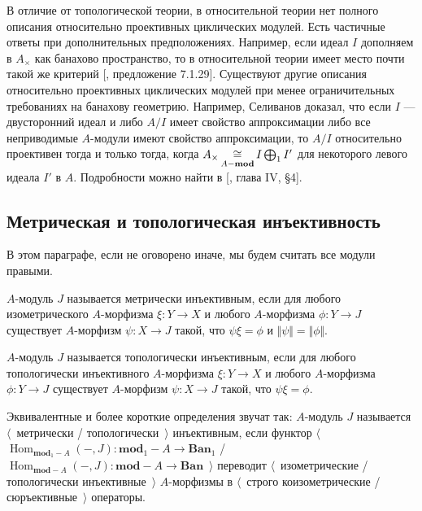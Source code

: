 В отличие от топологической теории, в относительной теории нет полного описания относительно проективных циклических модулей. Есть частичные ответы при дополнительных предположениях. Например, если идеал $I$ дополняем в $A_\times$ как банахово пространство, то в относительной теории имеет место почти такой же критерий [\cite{HelBanLocConvAlg}, предложение 7.1.29]. Существуют другие описания относительно проективных циклических модулей при менее ограничительных требованиях на банахову геометрию. Например, Селиванов доказал, что если $I$ --- двусторонний идеал и либо $A/I$ имеет свойство аппроксимации либо все неприводимые $A$-модули имеют свойство аппроксимации, то $A/I$  относительно проективен тогда и только тогда, когда $A_\times\mathop{\mathbin{\cong}}\limits_{A-\mathbf{mod}}I\bigoplus_1 I'$ для некоторого левого идеала $I'$ в $A$. Подробности можно найти в [\cite{HelHomolBanTopAlg}, глава IV, \S 4].




\subsection{Метрическая и топологическая инъективность}
\label{SubSectionMetricAndTopologicalInjectivity}

В этом параграфе, если не оговорено иначе, мы будем считать все модули правыми.

\begin{definition}\label{MetInjMod} $A$-модуль $J$ называется метрически инъективным, если для любого изометрического $A$-морфизма $\xi:Y\to X$ и любого $A$-морфизма $\phi:Y\to J$ существует $A$-морфизм $\psi:X\to J$ такой, что $\psi\xi=\phi$  и $\Vert\psi\Vert=\Vert\phi\Vert$.
\end{definition}

\begin{definition}\label{TopInjMod} $A$-модуль $J$ называется топологически инъективным, если для любого топологически инъективного $A$-морфизма $\xi:Y\to X$ и любого $A$-морфизма $\phi:Y\to J$ существует $A$-морфизм $\psi:X\to J$ такой, что $\psi\xi=\phi$.
\end{definition}

Эквивалентные и более короткие определения звучат так: $A$-модуль $J$ называется $\langle$~метрически / топологически~$\rangle$ инъективным, если функтор $\langle$~$\operatorname{Hom}_{\mathbf{mod}_1-A}(-,J):\mathbf{mod}_1-A\to\mathbf{Ban}_1$ / $\operatorname{Hom}_{\mathbf{mod}-A}(-,J):\mathbf{mod}-A\to\mathbf{Ban}$~$\rangle$ переводит $\langle$~изометрические / топологически инъективные~$\rangle$ $A$-морфизмы в $\langle$~строго коизометрические / сюръективные~$\rangle$ операторы.

